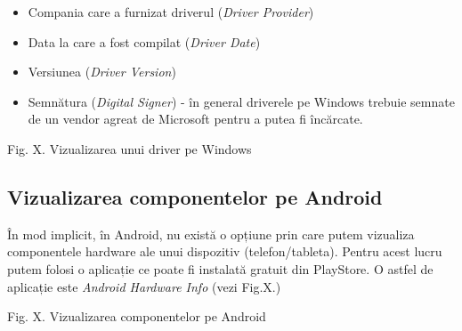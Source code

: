 \begin{itemize}
	\item Compania care a furnizat driverul (\textit{Driver Provider})
	\item Data la care a fost compilat (\textit{Driver Date})
	\item Versiunea (\textit{Driver Version})
	\item Semnătura (\textit{Digital Signer}) - în general driverele pe
		Windows trebuie semnate de un vendor agreat de Microsoft pentru
		a putea fi încărcate.
\end{itemize}

Fig. X. Vizualizarea unui driver pe Windows

\subsection{Vizualizarea componentelor pe Android}
\label{sec:hardware-virtualizare-android}

În mod implicit, în Android, nu există o opțiune prin care putem vizualiza
componentele hardware ale unui dispozitiv (telefon/tableta). Pentru acest lucru
putem folosi o aplicație ce poate fi instalată gratuit din PlayStore. O astfel
de aplicație este \textit{Android Hardware Info} (vezi Fig.X.)

Fig. X. Vizualizarea componentelor pe Android
